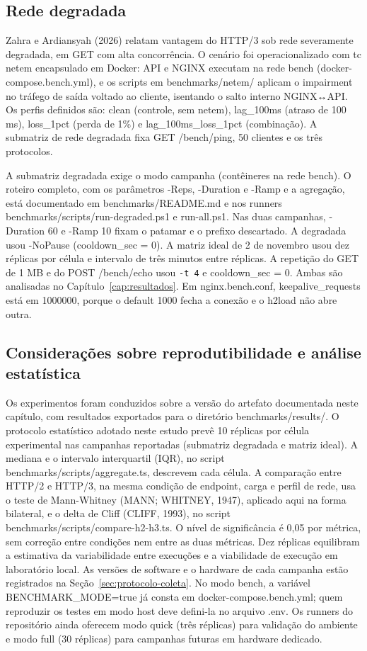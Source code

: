\subsection{Rede degradada}\label{sec:rede-degradada-desenho}

Zahra e Ardiansyah (2026) relatam vantagem do HTTP/3 sob rede severamente degradada, em GET com alta concorrência. O cenário foi operacionalizado com tc netem encapsulado em Docker: API e NGINX executam na rede bench (docker-compose.bench.yml), e os scripts em benchmarks/netem/ aplicam o impairment no tráfego de saída voltado ao cliente, isentando o salto interno NGINX↔API. Os perfis definidos são: clean (controle, sem netem), lag\_100ms (atraso de 100 ms), loss\_1pct (perda de 1\%) e lag\_100ms\_loss\_1pct (combinação). A submatriz de rede degradada fixa GET /bench/ping, 50 clientes e os três protocolos.

A submatriz degradada exige o modo campanha (contêineres na rede bench). O roteiro completo, com os parâmetros -Reps, -Duration e -Ramp e a agregação, está documentado em benchmarks/README.md e nos runners benchmarks/scripts/run-degraded.ps1 e run-all.ps1. Nas duas campanhas, -Duration 60 e -Ramp 10 fixam o patamar e o prefixo descartado. A degradada usou -NoPause (cooldown\_sec = 0). A matriz ideal de 2 de novembro usou dez réplicas por célula e intervalo de três minutos entre réplicas. A repetição do GET de 1 MB e do POST /bench/echo usou \texttt{-t 4} e cooldown\_sec = 0. Ambas são analisadas no Capítulo~\ref{cap:resultados}. Em nginx.bench.conf, keepalive\_requests está em 1000000, porque o default 1000 fecha a conexão e o h2load não abre outra.

\subsection{Considerações sobre reprodutibilidade e análise estatística}

Os experimentos foram conduzidos sobre a versão do artefato documentada neste capítulo, com resultados exportados para o diretório benchmarks/results/. O protocolo estatístico adotado neste estudo prevê 10 réplicas por célula experimental nas campanhas reportadas (submatriz degradada e matriz ideal). A mediana e o intervalo interquartil (IQR), no script benchmarks/scripts/aggregate.ts, descrevem cada célula. A comparação entre HTTP/2 e HTTP/3, na mesma condição de endpoint, carga e perfil de rede, usa o teste de Mann-Whitney (MANN; WHITNEY, 1947), aplicado aqui na forma bilateral, e o delta de Cliff (CLIFF, 1993), no script benchmarks/scripts/compare-h2-h3.ts. O nível de significância é 0,05 por métrica, sem correção entre condições nem entre as duas métricas. Dez réplicas equilibram a estimativa da variabilidade entre execuções e a viabilidade de execução em laboratório local. As versões de software e o hardware de cada campanha estão registrados na Seção~\ref{sec:protocolo-coleta}. No modo bench, a variável BENCHMARK\_MODE=true já consta em docker-compose.bench.yml; quem reproduzir os testes em modo host deve defini-la no arquivo .env. Os runners do repositório ainda oferecem modo quick (três réplicas) para validação do ambiente e modo full (30 réplicas) para campanhas futuras em hardware dedicado.

